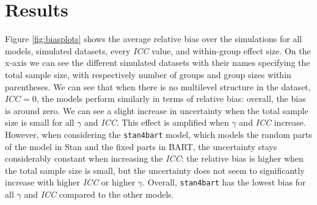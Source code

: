 \documentclass[10pt, a4paper, titlepage]{article}
\begin{document}
\section{Results}
\graphicspath{{./graphs/}}
Figure \ref{fig:biasplots} shows the average relative bias over the simulations for all models, simulated datasets, every \textit{ICC} value, and within-group effect size. On the x-axis we can see the different simulated datasets with their names specifying the total sample size, with respectively number of groups and group sizes within parentheses. We can see that when there is no multilevel structure in the dataset, $ICC = 0$, the models perform similarly in terms of relative bias: overall, the bias is around zero. We can see a slight increase in uncertainty when the total sample size is small for all $\gamma$ and \textit{ICC}. This effect is amplified when $\gamma$ and \textit{ICC} increase. However, when considering the \texttt{stan4bart} model, which models the random parts of the model in Stan and the fixed parts in BART, the uncertainty stays considerably constant when increasing the \textit{ICC}: the relative bias is higher when the total sample size is small, but the uncertainty does not seem to significantly increase with higher \textit{ICC} or higher $\gamma$. Overall, \texttt{stan4bart} has the lowest bias for all $\gamma$ and \textit{ICC} compared to the other models.
\end{document}
